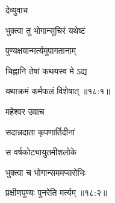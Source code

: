 \centerline{\Large\devanagarifont [   अष्टादशमो ऽध्ययः  ]}{\vrule depth10pt width0pt} 

 
\vers


{\devanagarifont देव्युवाच {\dandab}\dontdisplaylinenum  }%
 
\nemsloka 
{\devanagarifont भुक्त्वा तु भोगान्सुचिरं यथेष्टं }%
  \dontdisplaylinenum    {}%

\nemslokab

{\devanagarifont पुण्यक्षयान्मर्त्यमुपागतानाम्  \danda\dontdisplaylinenum }%
 
\nemslokac

{\devanagarifont चिह्नानि तेषां कथयस्व मे ऽद्य }%
  \dontdisplaylinenum

\nemslokad

{\devanagarifont यथाक्रमं कर्मफलं विशेषात् {॥१८:१॥} \veg\dontdisplaylinenum }%
 

 
\vers


{\devanagarifont महेश्वर उवाच {\dandab}\dontdisplaylinenum  }%

\nemsloka 
{\devanagarifont सदान्नदाता कृपणार्तिदीनां }%
  \dontdisplaylinenum
\nemslokab

{\devanagarifont स वर्षकोट्यायुतमीशलोके  \danda\dontdisplaylinenum }%

\nemslokac

{\devanagarifont भुक्त्वा च भोगान्सममप्सरोभिः }%
  \dontdisplaylinenum    {}%


\nemslokad

{\devanagarifont प्रक्षीणपुण्यः पुनरेति मर्त्यम् {॥१८:२॥} \veg\dontdisplaylinenum }%

\ujvers{}    %

\nemslokab

